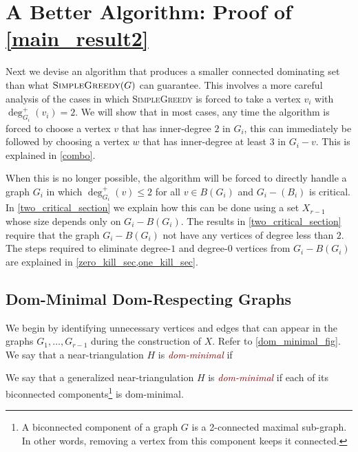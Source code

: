 \documentclass[a4paper,UKenglish, cleveref, autoref, thm-restate]{lipics-v2021}
\newcommand{\defin}[1]{\emph{\textcolor{Maroon}{#1}}}
\begin{document}
\section{A Better Algorithm: Proof of \cref{main_result2}}
\label{full_result}

Next we devise an algorithm that produces a smaller connected dominating set than what $\textsc{SimpleGreedy}(G)$ can guarantee.  This involves a more careful analysis of the cases in which \textsc{SimpleGreedy} is forced to take a vertex $v_i$ with $\deg^+_{G_i}(v_i)=2$.  We will show that in most cases, any time the algorithm is forced to choose a vertex $v$ that has inner-degree $2$ in $G_i$, this can immediately be followed by choosing a vertex $w$ that has inner-degree at least $3$ in $G_i-v$.  This is explained in \cref{combo}.

When this is no longer possible, the algorithm will be forced to directly handle a graph $G_i$ in which $\deg^+_{G_i}(v)\le 2$ for all $v\in B(G_i)$ and $G_i-(B_i)$ is critical.  In \cref{two_critical_section} we explain how this can be done using a set $X_{r-1}$ whose size depends only on $G_i-B(G_i)$.  The results in \cref{two_critical_section} require that the graph $G_i-B(G_i)$ not have any vertices of degree less than $2$.  The steps required to eliminate degree-$1$ and degree-$0$ vertices from $G_i-B(G_i)$ are explained in \cref{zero_kill_sec,one_kill_sec}.

\subsection{Dom-Minimal Dom-Respecting Graphs}

We begin by identifying unnecessary vertices and edges that can appear in the graphs $G_1,\ldots,G_{r-1}$ during the construction of $X$. Refer to \cref{dom_minimal_fig}.   We say that a near-triangulation $H$ is \defin{dom-minimal} if
We say that a generalized near-triangulation $H$ is \defin{dom-minimal} if each of its biconnected components\footnote{A biconnected component of a graph $G$ is a 2-connected maximal sub-graph. In other words, removing a vertex from this component keeps it connected.} is dom-minimal.
\end{document}
